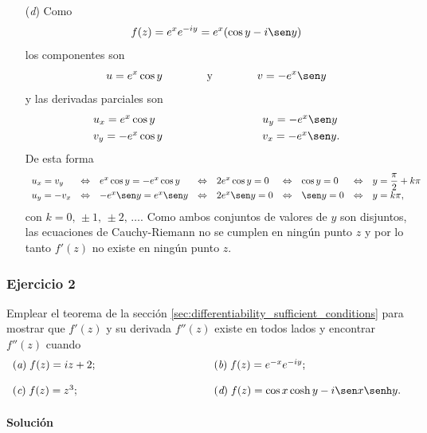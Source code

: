 \documentclass[a4paper]{report}
\begin{document}
\begin{enumerate}
 \item[(\textit{d})] Como
 \[
  f(z)=e^xe^{-iy}=e^x(\cos y-i\sen y)
 \]
 los componentes son 
 \[
  u=e^x\cos y
  \qquad\qquad\textrm{y}\qquad\qquad
  v=-e^x\sen y
 \]
 y las derivadas parciales son
 \[
 \begin{array}{ll}
  u_x=e^x\cos y\qquad\qquad\qquad\qquad&u_y=-e^x\sen y\\[\smallskipamount]
  v_y=-e^x\cos y\qquad\qquad\qquad\qquad&v_x=-e^x\sen y.
 \end{array}
 \]
 De esta forma
 \[
 \begin{array}{lllllllll}
  u_x=v_y&\Leftrightarrow&e^x\cos y=-e^x\cos y&\Leftrightarrow&2e^x\cos y=0&\Leftrightarrow&\cos y=0&\Leftrightarrow&y=\dfrac{\pi}{2}+k\pi\\[\smallskipamount]
  u_y=-v_x&\Leftrightarrow&-e^x\sen y=e^x\sen y&\Leftrightarrow&2e^x\sen y=0&\Leftrightarrow&\sen y=0&\Leftrightarrow&y=k\pi,
 \end{array}
 \] 
 con \(k=0,\,\pm1,\,\pm2,\,\dots\).
 Como ambos conjuntos de valores de \(y\) son disjuntos, las ecuaciones de Cauchy-Riemann no se cumplen en ningún punto \(z\) y por lo tanto \(f'(z)\) no existe en ningún punto \(z\).
\end{enumerate}

\subsubsection{Ejercicio 2}

Emplear el teorema de la sección \ref{sec:differentiability_sufficient_conditions} para mostrar que \(f'(z)\) y su derivada \(f''(z)\) existe en todos lados y encontrar \(f''(z)\) cuando
\[
 \begin{array}{ll}
  (\textit{a})\;f(z)=iz+2;\qquad\qquad\qquad\qquad\qquad&(\textit{b})\;f(z)=e^{-x}e^{-iy};\\[\bigskipamount]
  (\textit{c})\;f(z)=z^3;\qquad\qquad\qquad\qquad\qquad&(\textit{d})\;f(z)=\cos x\cosh y-i\sen x\senh y.
 \end{array}
\]

\paragraph{Solución} 
\end{document}
